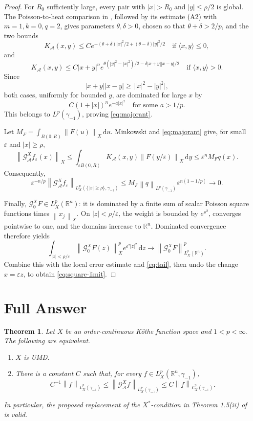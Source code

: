 \documentclass[11pt]{article}
\newtheorem{theorem}{Theorem}
\newcommand{\R}{\mathbb R}
\newcommand{\A}{\mathcal A}
\newcommand{\G}{\mathcal G}
\newcommand{\norm}[1]{\left\lVert #1\right\rVert}
\newcommand{\eps}{\varepsilon}
\newcommand{\dd}{\,\mathrm d}
\begin{document}
\begin{proof}
For \(R_0\) sufficiently large, every pair with
\(|x|>R_0\) and \(|y|\le\rho/2\) is global. The Poisson-to-heat comparison
in \cite{ABFR}, followed by its estimate (A2) with \(m=1,k=0,q=2\), gives
parameters \(\theta,\delta>0\), chosen so that
\(\theta+\delta>2/p\), and the two bounds
\[
 K_\A(x,y)\le
 C e^{-(\theta+\delta)|x|^2/2+(\theta-\delta)|y|^2/2}
 \quad\text{if }\langle x,y\rangle\le0,
 \tag{7}\label{eq:A2negative}
\]
and
\[
 K_\A(x,y)\le
 C|x+y|^n
 e^{\theta(|y|^2-|x|^2)/2
   -\delta|x+y||x-y|/2}
 \quad\text{if }\langle x,y\rangle>0.
 \tag{8}\label{eq:A2positive}
\]
Since
\[
 |x+y||x-y|\ge\big||x|^2-|y|^2\big|,
\]
both cases, uniformly for bounded \(y\), are dominated for large \(x\) by
\[
 C(1+|x|)^n e^{-a|x|^2}
\quad\text{for some }a>1/p.
\]
This belongs to \(L^p(\gamma_{-1})\), proving
\eqref{eq:majorant}.

Let \(M_F=\int_{B(0,R)}\norm{F(u)}_X\dd u\). Minkowski and
\eqref{eq:majorant} give, for small \(\eps\) and \(|x|\ge\rho\),
\[
 \norm{\G_\A^Xf_\eps(x)}_X
 \le \int_{\eps B(0,R)}K_\A(x,y)
       \norm{F(y/\eps)}_X\dd y
 \le \eps^nM_Fq(x).
\]
Consequently,
\[
 \eps^{-n/p}
 \norm{\G_\A^Xf_\eps}_{L_X^p(\{|x|\ge\rho\},\gamma_{-1})}
 \le
 M_F\norm q_{L^p(\gamma_{-1})}\eps^{n(1-1/p)}
 \longrightarrow0.
 \tag{9}\label{eq:tail}
\]

Finally, \(\G_0^XF\in L_X^p(\R^n)\): it is dominated by a finite sum of
scalar Poisson square functions times \(\norm{x_j}_X\). On
\(|z|<\rho/\eps\), the weight is bounded by \(e^{\rho^2}\), converges
pointwise to one, and the domains increase to \(\R^n\). Dominated convergence
therefore yields
\[
 \int_{|z|<\rho/\eps}\norm{\G_0^XF(z)}_X^p
 e^{\eps^2|z|^2}\dd z
 \longrightarrow
 \norm{\G_0^XF}_{L_X^p(\R^n)}^p.
\]
Combine this with the local error estimate and \eqref{eq:tail}, then undo
the change \(x=\eps z\), to obtain \eqref{eq:square-limit}.
\end{proof}

\section*{Full Answer}

\begin{theorem}\label{thm:answer}
Let \(X\) be an order-continuous K\"othe function space and
\(1<p<\infty\). The following are equivalent.
\begin{enumerate}
\item \(X\) is UMD.
\item There is a constant \(C\) such that, for every
\(f\in L_X^p(\R^n,\gamma_{-1})\),
\[
 C^{-1}\norm f_{L_X^p(\gamma_{-1})}
 \le\norm{\G_\A^Xf}_{L_X^p(\gamma_{-1})}
 \le C\norm f_{L_X^p(\gamma_{-1})}.
\]
\end{enumerate}
In particular, the proposed replacement of the \(X^*\)-condition in
Theorem 1.5(ii) of \cite{ABFR} is valid.
\end{theorem}
\end{document}
